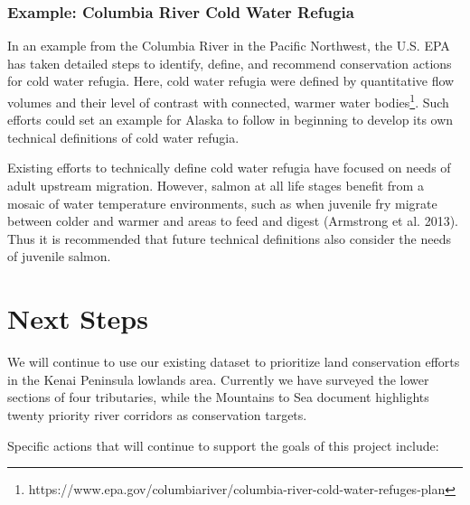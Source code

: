 \documentclass[
  letterpaper,
  DIV=11,
  numbers=noendperiod]{scrreprt}
\begin{document}
\hypertarget{example-columbia-river-cold-water-refugia}{%
\subsubsection*{Example: Columbia River Cold Water
Refugia}\label{example-columbia-river-cold-water-refugia}}

In an example from the Columbia River in the Pacific Northwest, the U.S.
EPA has taken detailed steps to identify, define, and recommend
conservation actions for cold water refugia. Here, cold water refugia
were defined by quantitative flow volumes and their level of contrast
with connected, warmer water bodies\footnote{https://www.epa.gov/columbiariver/columbia-river-cold-water-refuges-plan}.
Such efforts could set an example for Alaska to follow in beginning to
develop its own technical definitions of cold water refugia.

Existing efforts to technically define cold water refugia have focused
on needs of adult upstream migration. However, salmon at all life stages
benefit from a mosaic of water temperature environments, such as when
juvenile fry migrate between colder and warmer and areas to feed and
digest (Armstrong et al. 2013). Thus it is recommended that future
technical definitions also consider the needs of juvenile salmon.

\hypertarget{next-steps}{%
\section*{Next Steps}\label{next-steps}}


We will continue to use our existing dataset to prioritize land
conservation efforts in the Kenai Peninsula lowlands area. Currently we
have surveyed the lower sections of four tributaries, while the
Mountains to Sea document highlights twenty priority river corridors as
conservation targets.

Specific actions that will continue to support the goals of this project
include:
\end{document}
